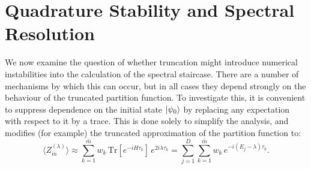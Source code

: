 \documentclass[reprint, aps,prx,showpacs,bibfootnote,preprintnumbers, mathtools, superscriptaddress, amsmath,amssymb]{revtex4-2}
\begin{document}
\section{Quadrature Stability and Spectral Resolution \label{sec:quadrature_stab}}
We now examine the question of whether truncation might introduce numerical instabilities into the calculation of the spectral staircase. There are a number of mechanisms by which this can occur, but in all cases they depend strongly on the behaviour of the truncated partition function. To investigate this, it is convenient to suppress dependence on the initial state $\ket{\psi_0}$ by replacing any expectation with respect to it by a trace. This is done solely to simplify the analysis, and modifies (for example) the truncated approximation of the partition function to:
\begin{equation}
\label{eq:Z_trace}
\langle Z_{\bar{m}}^{(\lambda)} \rangle \approx \sum_{k=1}^{\bar{m}} w_k\, \mathrm{Tr}\left[ e^{-i H \tau_k} \right]\, e^{2i \lambda \tau_k}
= \sum_{j=1}^{D} \sum_{k=1}^{\bar{m}} w_k\, e^{-i(E_j - \lambda) \tau_k}.
\end{equation}

\end{document}
